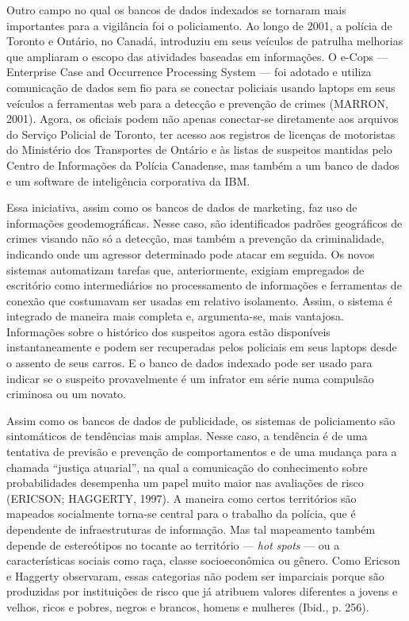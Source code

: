 Outro campo no qual os bancos de dados indexados se tornaram mais
importantes para a vigilância foi o policiamento. Ao longo de 2001, a
polícia de Toronto e Ontário, no Canadá, introduziu em seus veículos de
patrulha melhorias que ampliaram o escopo das atividades baseadas em
informações. O e-Cops --- Enterprise Case and Occurrence Processing
System --- foi adotado e utiliza comunicação de dados sem fio para se
conectar policiais usando laptops em seus veículos a ferramentas web
para a detecção e prevenção de crimes (MARRON, 2001). Agora, os oficiais
podem não apenas conectar-se diretamente aos arquivos do Serviço
Policial de Toronto, ter acesso aos registros de licenças de motoristas
do Ministério dos Transportes de Ontário e às listas de suspeitos
mantidas pelo Centro de Informações da Polícia Canadense, mas também a
um banco de dados e um software de inteligência corporativa da IBM.

Essa iniciativa, assim como os bancos de dados de marketing, faz uso de
informações geodemográficas. Nesse caso, são identificados padrões
geográficos de crimes visando não só a detecção, mas também a prevenção
da criminalidade, indicando onde um agressor determinado pode atacar em
seguida. Os novos sistemas automatizam tarefas que, anteriormente,
exigiam empregados de escritório como intermediários no processamento de
informações e ferramentas de conexão que costumavam ser usadas em
relativo isolamento. Assim, o sistema é integrado de maneira mais
completa e, argumenta-se, mais vantajosa. Informações sobre o histórico
dos suspeitos agora estão disponíveis instantaneamente e podem ser
recuperadas pelos policiais em seus laptops desde o assento de seus
carros. E o banco de dados indexado pode ser usado para indicar se o
suspeito provavelmente é um infrator em série numa compulsão criminosa
ou um novato.

Assim como os bancos de dados de publicidade, os sistemas de
policiamento são sintomáticos de tendências mais amplas. Nesse caso, a
tendência é de uma tentativa de previsão e prevenção de comportamentos e
de uma mudança para a chamada ``justiça atuarial'', na qual a
comunicação do conhecimento sobre probabilidades desempenha um papel
muito maior nas avaliações de risco (ERICSON; HAGGERTY, 1997). A maneira
como certos territórios são mapeados socialmente torna-se central para o
trabalho da polícia, que é dependente de infraestruturas de informação.
Mas tal mapeamento também depende de estereótipos no tocante ao
território --- \emph{hot spots} --- ou a características sociais como
raça, classe socioeconômica ou gênero. Como Ericson e Haggerty
observaram, essas categorias não podem ser imparciais porque são
produzidas por instituições de risco que já atribuem valores diferentes
a jovens e velhos, ricos e pobres, negros e brancos, homens e mulheres
(Ibid., p. 256).

